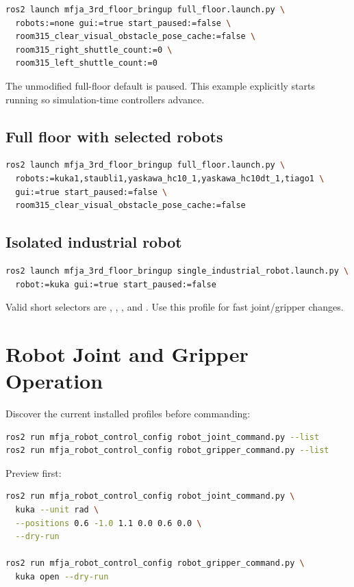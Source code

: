 \begin{lstlisting}[language=bash]
ros2 launch mfja_3rd_floor_bringup full_floor.launch.py \
  robots:=none gui:=true start_paused:=false \
  room315_clear_visual_obstacle_pose_cache:=false \
  room315_right_shuttle_count:=0 \
  room315_left_shuttle_count:=0
\end{lstlisting}

The unmodified full-floor default is paused. This example explicitly starts
running so simulation-time controllers advance.

\subsection{Full floor with selected robots}

\begin{lstlisting}[language=bash]
ros2 launch mfja_3rd_floor_bringup full_floor.launch.py \
  robots:=kuka1,staubli1,yaskawa_hc10_1,yaskawa_hc10dt_1,tiago1 \
  gui:=true start_paused:=false \
  room315_clear_visual_obstacle_pose_cache:=false
\end{lstlisting}

\subsection{Isolated industrial robot}

\begin{lstlisting}[language=bash]
ros2 launch mfja_3rd_floor_bringup single_industrial_robot.launch.py \
  robot:=kuka gui:=true start_paused:=false
\end{lstlisting}

Valid short selectors are , , , and
\code{hc10dt}. Use this profile for fast joint/gripper changes.

\section{Robot Joint and Gripper Operation}

Discover the current installed profiles before commanding:

\begin{lstlisting}[language=bash]
ros2 run mfja_robot_control_config robot_joint_command.py --list
ros2 run mfja_robot_control_config robot_gripper_command.py --list
\end{lstlisting}

Preview first:

\begin{lstlisting}[language=bash]
ros2 run mfja_robot_control_config robot_joint_command.py \
  kuka --unit rad \
  --positions 0.6 -1.0 1.1 0.0 0.6 0.0 \
  --dry-run

ros2 run mfja_robot_control_config robot_gripper_command.py \
  kuka open --dry-run
\end{lstlisting}

